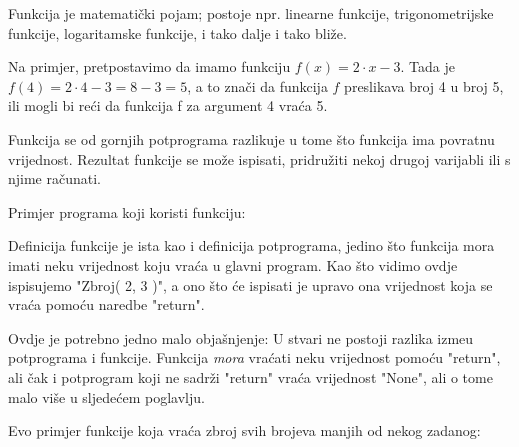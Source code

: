 Funkcija je matemati\v{c}ki pojam; postoje npr. linearne funkcije,
trigonometrijske funkcije, logaritamske funkcije, i tako dalje i
tako bli\v{z}e.

Na primjer, pretpostavimo da imamo funkciju $f(x)=2\cdot x-3$. Tada
je $f(4)=2\cdot 4-3=8-3=5$, a to zna\v{c}i da funkcija $f$ preslikava
broj 4 u broj 5, ili mogli bi re\'{c}i da funkcija f za argument
4 vra\'{c}a 5.

Funkcija se od gornjih potprograma razlikuje u tome \v{s}to funkcija
ima povratnu vrijednost. Rezultat funkcije se mo\v{z}e ispisati,
pridru\v{z}iti nekoj drugoj varijabli ili s njime ra\v{c}unati. 

Primjer programa koji koristi funkciju:


Definicija funkcije je ista kao i definicija potprograma, jedino \v{s}to
funkcija mora imati neku vrijednost koju vra\'{c}a u glavni program. Kao
\v{s}to vidimo ovdje ispisujemo "Zbroj( 2, 3 )", a ono \v{s}to \'{c}e
ispisati je upravo ona vrijednost koja se vra\'{c}a pomo\'{c}u naredbe
"return".

Ovdje je potrebno jedno malo obja\v{s}njenje: U stvari ne postoji razlika
izme\dj{}u potprograma i funkcije. Funkcija \emph{mora} vra\'{c}ati neku
vrijednost pomo\'{c}u "return", ali \v{c}ak i potprogram koji ne sadr\v{z}i
"return" vra\'{c}a vrijednost "None", ali o tome malo vi\v{s}e u
sljede\'{c}em poglavlju.

Evo primjer funkcije koja vra\'{c}a zbroj svih brojeva manjih od nekog
zadanog:


